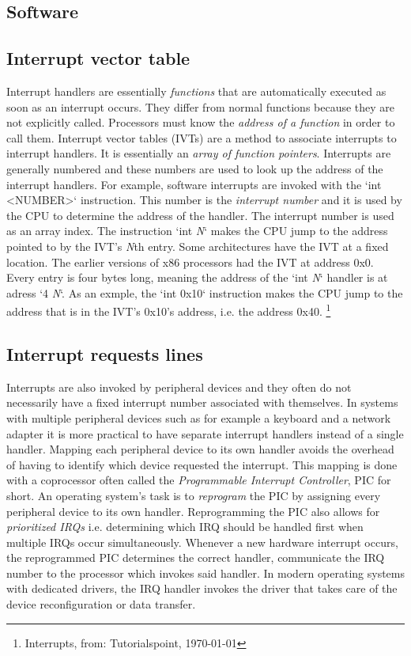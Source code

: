 \subsection{Software}

\subsection{Interrupt vector table}

Interrupt handlers are essentially \textit{functions} that are automatically executed as soon as an
interrupt occurs. They differ from normal functions because they are not explicitly called.
Processors must know the \textit{address of a function} in order to call them. Interrupt vector
tables (IVTs) are a method to associate interrupts to interrupt handlers. It is essentially an
\textit{array of function pointers}. Interrupts are generally numbered and these numbers are used to look up 
the address of the interrupt handlers. For example, software interrupts are invoked with the `int 
\textless NUMBER\textgreater` instruction. This number is the \textit{interrupt number} and it is used by the CPU to determine 
the address of the handler. The interrupt number is used as an array index. The instruction `int \textit{N}` 
makes the CPU jump to the address pointed to by the IVT's \textit{N}th entry. Some architectures have the IVT
at a fixed location. The earlier versions of x86 processors had the IVT at address 0x0. Every entry
is four bytes long, meaning the address of the `int \textit{N}` handler is at adress `4 \* \textit{N}`. As an exmple,
the `int 0x10` instruction makes the CPU jump to the address that is in the IVT's 0x10's address,
i.e. the address 0x40. \footnote{Interrupts, from: Tutorialspoint, \today}

\subsection{Interrupt requests lines}

Interrupts are also invoked by peripheral devices and they often do not necessarily have a fixed 
interrupt number associated with themselves. In systems with multiple peripheral devices such as for 
example a keyboard and a network adapter it is more practical to have separate interrupt handlers
instead of a single handler. Mapping each peripheral device to its own handler avoids the overhead of 
having to identify which device requested the interrupt. This mapping is done with a coprocessor often
called the \textit{Programmable Interrupt Controller}, PIC for short. An operating system's task is to
\textit{reprogram} the PIC by assigning every peripheral device to its own handler. Reprogramming the PIC also
allows for \textit{prioritized IRQs} i.e. determining which IRQ should be handled first when multiple IRQs 
occur simultaneously. Whenever a new hardware interrupt occurs, the reprogrammed PIC determines
the correct handler, communicate the IRQ number to the processor which invokes said handler. In
modern operating systems with dedicated drivers, the IRQ handler invokes the driver that takes
care of the device reconfiguration or data transfer.
